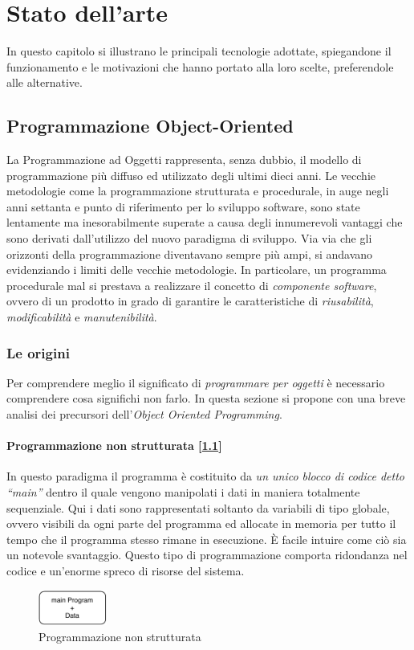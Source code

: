 \chapter{Stato dell'arte}
\label{chap:stateofart}
In questo capitolo si illustrano le principali tecnologie adottate, spiegandone il funzionamento e le motivazioni che hanno portato alla loro scelte, preferendole alle alternative.

\section{Programmazione Object-Oriented}
La Programmazione ad Oggetti rappresenta, senza dubbio, il modello di programmazione più diffuso ed utilizzato degli ultimi dieci anni.
Le vecchie metodologie come la programmazione strutturata e procedurale, in auge negli anni settanta e punto di riferimento per lo sviluppo software, sono state lentamente ma inesorabilmente superate a causa degli innumerevoli vantaggi che sono derivati dall’utilizzo del nuovo paradigma di sviluppo. Via via che gli orizzonti della programmazione diventavano sempre più ampi, si andavano evidenziando i limiti delle vecchie metodologie. In particolare, un programma procedurale mal si prestava a realizzare il concetto di \textit{componente software}, ovvero di un prodotto in grado di garantire le caratteristiche di \textit{riusabilità}, \textit{modificabilità} e \textit{manutenibilità}.
\subsection{Le origini}
Per comprendere meglio il significato di \textsl{programmare per oggetti} è necessario comprendere cosa significhi non farlo. In questa sezione si propone con una breve analisi dei precursori dell'\textit{Object Oriented Programming}.

\subsubsection{Programmazione non strutturata [\ref{fig:nonstructured-programming}]}
In questo paradigma il programma è costituito da \textit{un unico blocco di codice detto “main”} dentro il quale vengono manipolati i dati in maniera totalmente sequenziale. Qui i dati sono rappresentati soltanto da variabili di tipo globale, ovvero visibili da ogni parte del programma ed allocate in memoria per tutto il tempo che il programma stesso rimane in esecuzione. È facile intuire come ciò sia un notevole svantaggio. Questo tipo di programmazione comporta ridondanza nel codice e un'enorme spreco di risorse del sistema. 
\begin{figure}[H]
    \centering
    \includegraphics[width=0.20\textwidth]{images/01_1_non_structured_data.pdf}
    \caption{Programmazione non strutturata}
    \label{fig:nonstructured-programming}
\end{figure}

